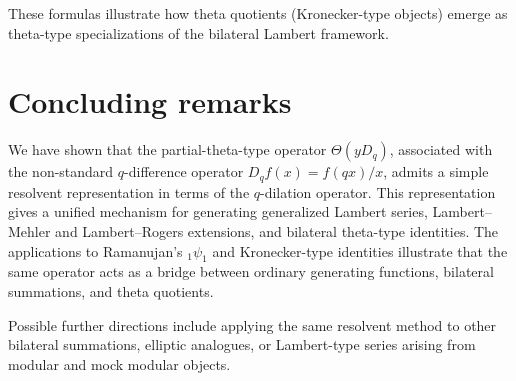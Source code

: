 \documentclass[12pt]{article}
\begin{document}
\medskip
\noindent
These formulas illustrate how theta quotients (Kronecker-type objects) emerge as
theta-type specializations of the bilateral Lambert framework.




\section{Concluding remarks}

We have shown that the partial-theta-type operator $\Theta(yD_q)$, associated with the non-standard $q$-difference operator $D_qf(x)=f(qx)/x$, admits a simple resolvent representation in terms of the $q$-dilation operator. This representation gives a unified mechanism for generating generalized Lambert series, Lambert--Mehler and Lambert--Rogers extensions, and bilateral theta-type identities. The applications to Ramanujan's ${}_1\psi_1$ and Kronecker-type identities illustrate that the same operator acts as a bridge between ordinary generating functions, bilateral summations, and theta quotients.

Possible further directions include applying the same resolvent method to other bilateral summations, elliptic analogues, or Lambert-type series arising from modular and mock modular objects.
\end{document}

